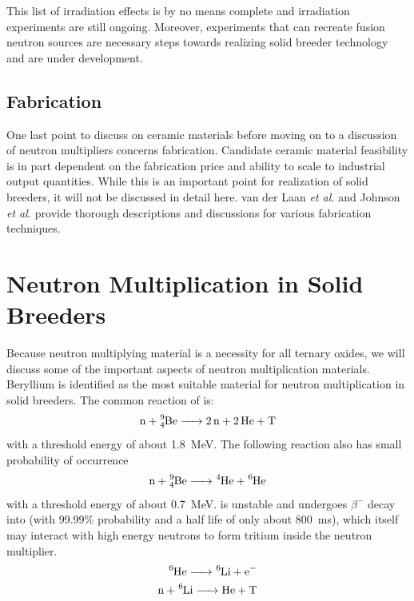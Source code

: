 \documentclass[11pt]{report} %
\begin{document}
This list of irradiation effects is by no means complete and irradiation experiments are still ongoing.\cite{vanderLaan200099} Moreover, experiments that can recreate fusion neutron sources are necessary steps towards realizing solid breeder technology and are under development.\cite{Abdou1996d}



\subsection{Fabrication}
One last point to discuss on ceramic materials before moving on to a discussion of neutron multipliers concerns fabrication. Candidate ceramic material feasibility is in part dependent on the fabrication price and ability to scale to industrial output quantities. While this is an important point for realization of solid breeders, it will not be discussed in detail here. van der Laan \textit{et al.}\cite{vanderLaan200099} and Johnson \textit{et al.}\cite{Johnson1991} provide thorough descriptions and discussions for various fabrication techniques.







\section{Neutron Multiplication in Solid Breeders}
Because neutron multiplying material is a necessity for all ternary oxides, we will discuss some of the important aspects of neutron multiplication materials. Beryllium is identified as the most suitable material for neutron multiplication in solid breeders. The common reaction of  is:
\begin{align}
\ce{n + ^9_4Be -> 2n + 2He + T}\label{eq:Be-n}
\end{align}
with a threshold energy of about \SI{1.8}{\mega\electronvolt}. The following reaction also has small probability of occurrence
\begin{align}
\ce{n + ^9_4Be -> ^4He + ^6He}
\end{align}
with a threshold energy of about \SI{0.7}{\mega\electronvolt}.  is unstable and undergoes $\beta^-$ decay into  (with 99.99\% probability and a half life of only about \SI{800}{\milli\second}), which itself may interact with high energy neutrons to form tritium inside the neutron multiplier.
\begin{subequations}
\begin{align}
\ce{^6He -> ^6Li + e^-} \\
\ce{n + ^6Li -> He + T}
\end{align}
\end{subequations}
\end{document}
